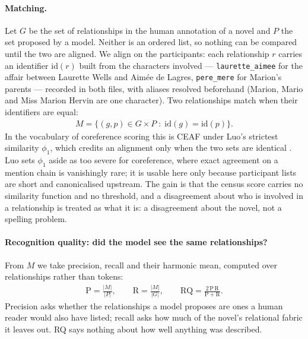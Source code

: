 \paragraph{Matching.} Let $G$ be the set of relationships in the human
annotation of a novel and $P$ the set proposed by a model. Neither is an ordered
list, so nothing can be compared until the two are aligned. We align on the
participants: each relationship $r$ carries an identifier $\mathrm{id}(r)$ built
from the characters involved --- \texttt{laurette\_aimee} for the affair between
Laurette Wells and Aimée de Lagres, \texttt{pere\_mere} for Marion's parents ---
recorded in both files, with aliases resolved beforehand (Marion, Mario and Miss
Marion Hervin are one character). Two relationships match when their identifiers
are equal:
%
\begin{align}
M = \{(g,p) \in G \times P \;:\; \mathrm{id}(g) = \mathrm{id}(p)\} .
\end{align}
%
In the vocabulary of coreference scoring this is CEAF under Luo's strictest
similarity $\phi_1$, which credits an alignment only when the two sets are
identical \cite{luo2005coreference}. Luo sets $\phi_1$ aside as too severe for
coreference, where exact agreement on a mention chain is vanishingly rare; it is
usable here only because participant lists are short and canonicalised upstream.
The gain is that the census score carries no similarity function and no
threshold, and a disagreement about who is involved in a relationship is treated
as what it is: a disagreement about the novel, not a spelling problem.

\paragraph{Recognition quality: did the model see the same relationships?} From
$M$ we take precision, recall and their harmonic mean, computed over
relationships rather than tokens:
%
\begin{align}
\mathrm{P} = \frac{|M|}{|P|}, \qquad
\mathrm{R} = \frac{|M|}{|G|}, \qquad
\mathrm{RQ} = \frac{2\,\mathrm{P}\,\mathrm{R}}{\mathrm{P} + \mathrm{R}} .
\end{align}
%
Precision asks whether the relationships a model proposes are ones a human
reader would also have listed; recall asks how much of the novel's relational
fabric it leaves out. RQ says nothing about how well anything was described.

